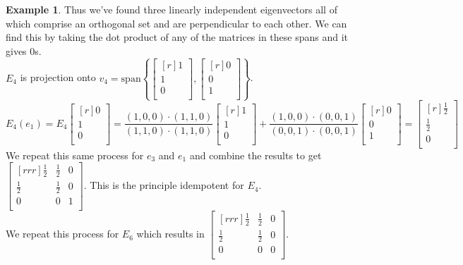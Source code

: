 \documentclass{report}
\theoremstyle{plain}
\theoremstyle{definition}
\newtheorem*{ex}{Example}
\theoremstyle{plain}
\begin{document}
\begin{ex}
Thus we've found three linearly independent eigenvectors all of which comprise an orthogonal set and are perpendicular to each other. We can find this by taking the dot product of any of the matrices in these spans and it gives 0s.\\
$E_4$ is projection onto $v_4 = \mathrm{span}\left\{\begin{bmatrix}[r]1\\1\\0\\\end{bmatrix},\begin{bmatrix}[r]0\\0\\1\\\end{bmatrix}\right\}$.\\
\[ E_4(e_1) = E_4\begin{bmatrix}[r]0\\1\\0\\\end{bmatrix} = \dfrac{(1,0,0)\cdot (1,1,0)}{(1,1,0)\cdot (1,1,0)}\begin{bmatrix}[r]1\\1\\0\\\end{bmatrix} + \dfrac{(1,0,0)\cdot (0,0,1)}{(0,0,1)\cdot (0,0,1)}\begin{bmatrix}[r]0\\0\\1\\\end{bmatrix} =\begin{bmatrix}[r]\frac{1}{2}\\\frac{1}{2}\\0\\\end{bmatrix} \]
We repeat this same process for $e_3$ and $e_1$ and combine the results to get $\begin{bmatrix}[rrr]\frac{1}{2}&\frac{1}{2}&0\\\frac{1}{2}&\frac{1}{2}&0\\0&0&1\\\end{bmatrix}$. This is the principle idempotent for $E_4$.\\
We repeat this process for $E_6$ which results in $\begin{bmatrix}[rrr]\frac{1}{2}&\frac{1}{2}&0\\\frac{1}{2}&\frac{1}{2}&0\\0&0&0\\\end{bmatrix}$.\\

\end{ex}
\end{document}
